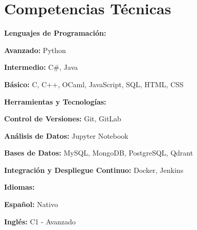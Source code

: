\section{Competencias Técnicas}

\begin{onecolentry}
    \textbf{Lenguajes de Programación:}
    \begin{highlights}
        \item \textbf{Avanzado:} Python
        \item \textbf{Intermedio:} C\#, Java
        \item \textbf{Básico:} C, C++, OCaml, JavaScript, SQL, HTML, CSS
    \end{highlights}
 \end{onecolentry}
    
 \vspace{0.2 cm}
    
\begin{onecolentry}
    \textbf{Herramientas y Tecnologías:} 
    \begin{highlights}
        \item \textbf{Control de Versiones:} Git, GitLab
        \item \textbf{Análisis de Datos:} Jupyter Notebook
        \item \textbf{Bases de Datos:} MySQL, MongoDB, PostgreSQL, Qdrant
        \item \textbf{Integración y Despliegue Continuo:} Docker, Jenkins
    \end{highlights}
\end{onecolentry}

\vspace{0.2 cm}

\begin{onecolentry}
    \textbf{Idiomas:}
    \begin{highlights}
        \item \textbf{Español:} Nativo
        \item \textbf{Inglés:} C1 - Avanzado
    \end{highlights}
 \end{onecolentry}